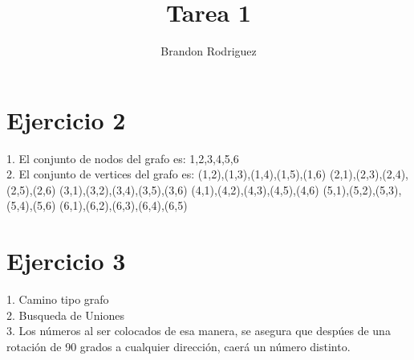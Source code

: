 \documentclass[14pt]{article}
\author{Brandon Rodriguez}
\title{Tarea 1}
\begin{document}
\maketitle
\section{Ejercicio 2}
1. El conjunto de nodos del grafo es: 
{1,2,3,4,5,6}
\\

2. El conjunto de vertices del grafo es: 
(1,2),(1,3),(1,4),(1,5),(1,6)
(2,1),(2,3),(2,4),(2,5),(2,6)
(3,1),(3,2),(3,4),(3,5),(3,6)
(4,1),(4,2),(4,3),(4,5),(4,6)
(5,1),(5,2),(5,3),(5,4),(5,6)
(6,1),(6,2),(6,3),(6,4),(6,5)

\section{Ejercicio 3}
1. Camino tipo grafo
\\
2. Busqueda de Uniones
\\
3. Los números al ser colocados de esa manera, se asegura que despúes de una rotación de 90
grados a cualquier dirección, caerá un número distinto.
\end{document}
